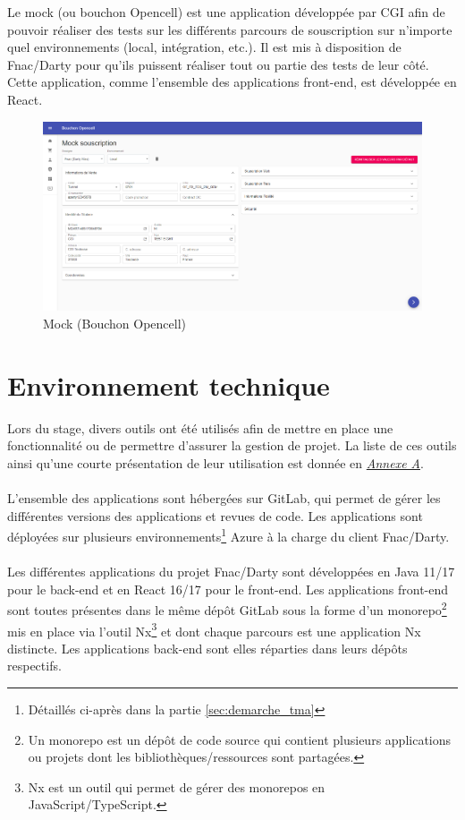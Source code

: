 \documentclass[12pt, a4paper]{report}
\begin{document}
	Le mock (ou bouchon Opencell) est une application développée par CGI afin de pouvoir réaliser des tests sur les différents parcours de souscription sur n'importe quel environnements (local, intégration, etc.). Il est mis à disposition de Fnac/Darty pour qu'ils puissent réaliser tout ou partie des tests de leur côté. Cette application, comme l'ensemble des applications front-end, est développée en React.
	\\
	\begin{figure}[!h]
		\centering
		\includegraphics[width=1\textwidth]{assets/images/mock_souscriptions_new.png}
		\vspace{-.6cm}
		\caption{Mock (Bouchon Opencell)}
	\end{figure}
	
	\section{Environnement technique}

	Lors du stage, divers outils ont été utilisés afin de mettre en place une fonctionnalité ou de permettre d'assurer la gestion de projet. La liste de ces outils ainsi qu'une courte présentation de leur utilisation est donnée en \hyperref[sec:outils]{\it{Annexe A}}.
	\\\\
	L'ensemble des applications sont hébergées sur GitLab, qui permet de gérer les différentes versions des applications et revues de code. Les applications sont déployées sur plusieurs environnements\footnote{Détaillés ci-après dans la partie \ref{sec:demarche_tma}} Azure à la charge du client Fnac/Darty. 
	\\\\
	Les différentes applications du projet Fnac/Darty sont développées en Java 11/17 pour le back-end et en React 16/17 pour le front-end. Les applications front-end sont toutes présentes dans le même dépôt GitLab sous la forme d'un monorepo\footnote{Un monorepo est un dépôt de code source qui contient plusieurs applications ou projets dont les bibliothèques/ressources sont partagées.} mis en place via l'outil Nx\footnote{Nx est un outil qui permet de gérer des monorepos en JavaScript/TypeScript.} et dont chaque parcours est une application Nx distincte. Les applications back-end sont elles réparties dans leurs dépôts respectifs.
\end{document}
